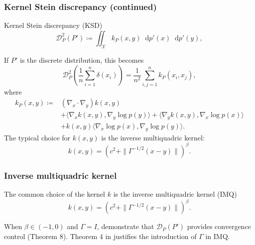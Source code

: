 \documentclass{beamer}
\newcommand*\diff{\mathop{}\!\mathrm{d}}
\begin{document}
\begin{frame}
\frametitle{Kernel Stein discrepancy (continued)}

\begin{block}{Kernel Stein discrepancy (KSD)}
\begin{equation*}
\mathcal{D}_{P}^2(P') \coloneq \iint_\mathcal{X} k_P(x, y) \diff p'(x) \diff p'(y),
\end{equation*}

\end{block}

If $P'$ is the discrete distribution, this becomes
\begin{equation*}
\mathcal{D}_{P}^2\left(\frac{1}{n} \sum_{i=1}^n \delta(x_i)\right) = \frac{1}{n^2} \sum_{i,j=1}^n k_P(x_i, x_j),
\label{eq:ksd:discrete}
\end{equation*}
where
\begin{equation*}
\begin{aligned}
k_P(x, y) \coloneq 
&(\nabla_x\cdot\nabla_y) k(x,y) \\
&+ \langle \nabla_x k(x, y), \nabla_y \log p(y) \rangle + \langle \nabla_y k(x, y), \nabla_x \log p(x) \rangle \\
&+ k(x, y) \langle \nabla_x \log p(x), \nabla_y \log p(y) \rangle.
\end{aligned}
\end{equation*}
The typical choice for $k(x, y)$ is the inverse multiquadric kernel:
\begin{equation*}
k(x, y) = \left(c^2 + \|\Gamma^{-1/2}(x-y)\|\right)^\beta.
\end{equation*}

\end{frame}

\begin{frame}
\frametitle{Inverse multiquadric kernel}

The common choice of the kernel $k$ is the inverse multiquadric kernel (IMQ)
\begin{equation*}
k(x, y) = \left(c^2 + \|\Gamma^{-1/2}(x-y)\|\right)^\beta.
\end{equation*}

When $\beta \in (-1, 0)$ and $\Gamma = I$, \cite{gorhamMeasuringSampleQuality2017} demonstrate that $\mathcal{D}_{P}(P')$ provides convergence control (Theorem 8). Theorem 4 in \cite{chenSteinPointMarkov2019} justifies the introduction of $\Gamma$ in IMQ.

\end{frame}
\end{document}
